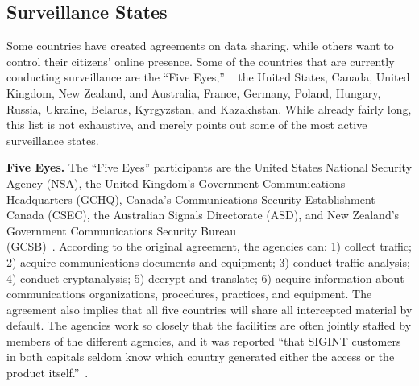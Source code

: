 \subsection{Surveillance States}

Some countries have created agreements on data sharing, while others want to control their citizens' online presence.  Some of the countries that are currently conducting surveillance are the ``Five Eyes,'' ~\cite{lander2004international, eyeswideopen} the United States, Canada, United Kingdom, New Zealand, and Australia, France, Germany, Poland, Hungary, Russia, Ukraine, Belarus, Kyrgyzstan, and Kazakhstan.  While already fairly long, this list is not exhaustive, and merely points out some of the most active surveillance states.

{\bf Five Eyes.} The ``Five Eyes'' participants are the United States National Security Agency (NSA), the United Kingdom's Government Communications Headquarters (GCHQ), Canada's Communications Security Establishment Canada (CSEC), the Australian Signals Directorate (ASD), and New Zealand's Government Communications Security Bureau \\(GCSB)~\cite{eyeswideopen}.  According to the original agreement, the agencies can: 1) collect traffic; 2) acquire communications documents and equipment; 3) conduct traffic analysis; 4) conduct cryptanalysis; 5) decrypt and translate; 6) acquire information about communications organizations, procedures, practices, and equipment.  The agreement also implies that all five countries will share all intercepted material by default.  The agencies work so closely that the facilities are often jointly staffed by members of the different agencies, and it was reported ``that SIGINT customers in both capitals seldom know which country generated either the access or the product itself.''~\cite{lander2004international}.

